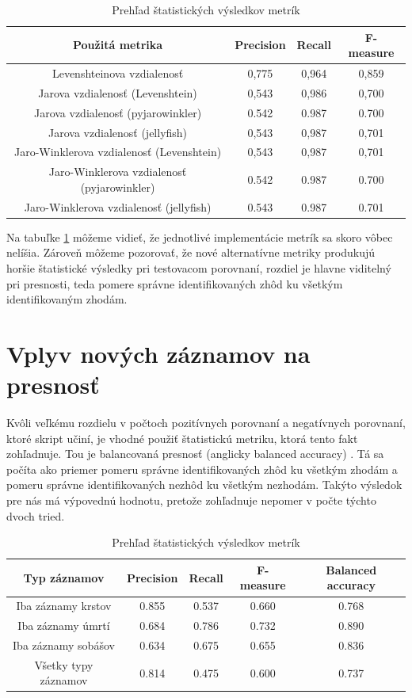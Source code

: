 \begin{table}[H]
\caption{Prehľad štatistických výsledkov metrík} \label{tab:results}
\begin{tabular}{ |c|c|c|c| } 
 \hline
 Použitá metrika & Precision & Recall & F-measure \\ 
 \hline
 Levenshteinova vzdialenosť & 0,775 & 0,964 & 0,859 \\
 \hline
 Jarova vzdialenosť (Levenshtein) & 0,543 & 0,986 & 0,700 \\
 \hline
 Jarova vzdialenosť (pyjarowinkler) & 0.542 & 0.987 & 0.700\\
 \hline
 Jarova vzdialenosť (jellyfish) & 0,543 & 0,987 & 0,701 \\
 \hline
 Jaro-Winklerova vzdialenosť (Levenshtein) & 0,543 & 0,987 & 0,701 \\
 \hline
 Jaro-Winklerova vzdialenosť (pyjarowinkler) & 0.542 & 0.987 & 0.700\\
 \hline
 Jaro-Winklerova vzdialenosť (jellyfish) & 0.543 & 0.987 & 0.701\\
 \hline
\end{tabular}
\end{table}

Na tabuľke \ref{tab:results} môžeme vidieť, že jednotlivé implementácie metrík sa skoro vôbec nelíšia. Zároveň môžeme pozorovať, že nové alternatívne metriky produkujú horšie štatistické výsledky pri testovacom porovnaní, rozdiel je hlavne viditelný pri presnosti, teda pomere správne identifikovaných zhôd ku všetkým identifikovaným zhodám.

\section{Vplyv nových záznamov na presnosť}

Kvôli veľkému rozdielu v počtoch pozitívnych porovnaní a negatívnych porovnaní, ktoré skript učiní, je vhodné použiť štatistickú metriku, ktorá tento fakt zohľadnuje. Tou je balancovaná presnosť (anglicky balanced accuracy) \cite{balanced}. Tá sa počíta ako priemer pomeru správne identifikovaných zhôd ku všetkým zhodám a pomeru správne identifikovaných nezhôd ku všetkým nezhodám. Takýto výsledok pre nás má výpovednú hodnotu, pretože zohľadnuje nepomer v počte týchto dvoch tried.

\begin{table}[H]
\caption{Prehľad štatistických výsledkov metrík} \label{tab:results2}
\begin{tabular}{ |c|c|c|c|c| } 
 \hline
 Typ záznamov & Precision & Recall & F-measure & Balanced accuracy \\ 
 \hline
 Iba záznamy krstov & 0.855 & 0.537 & 0.660 & 0.768 \\
 \hline
 Iba záznamy úmrtí & 0.684 & 0.786 & 0.732 & 0.890 \\
 \hline
 Iba záznamy sobášov & 0.634 & 0.675 & 0.655 & 0.836 \\
 \hline
 Všetky typy záznamov & 0.814 & 0.475 & 0.600 & 0.737\\
 \hline
\end{tabular}
\end{table}

